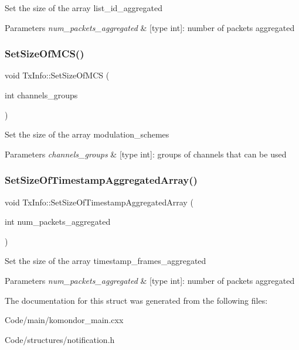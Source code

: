 Set the size of the array list\+\_\+id\+\_\+aggregated 
\begin{DoxyParams}{Parameters}
{\em num\+\_\+packets\+\_\+aggregated} & \mbox{[}type int\mbox{]}\+: number of packets aggregated \\
\hline
\end{DoxyParams}
\mbox{\label{structTxInfo_a169074644cac33d0c8c547ef99dded16}} 
\subsubsection{\texorpdfstring{Set\+Size\+Of\+M\+C\+S()}{SetSizeOfMCS()}}
{\footnotesize\ttfamily void Tx\+Info\+::\+Set\+Size\+Of\+M\+CS (\begin{DoxyParamCaption}\item[{int}]{channels\+\_\+groups }\end{DoxyParamCaption})\hspace{0.3cm}{\ttfamily [inline]}}

Set the size of the array modulation\+\_\+schemes 
\begin{DoxyParams}{Parameters}
{\em channels\+\_\+groups} & \mbox{[}type int\mbox{]}\+: groups of channels that can be used \\
\hline
\end{DoxyParams}
\mbox{\label{structTxInfo_afe5b38350ba2e0b39526eee01cf0294b}} 
\subsubsection{\texorpdfstring{Set\+Size\+Of\+Timestamp\+Aggregated\+Array()}{SetSizeOfTimestampAggregatedArray()}}
{\footnotesize\ttfamily void Tx\+Info\+::\+Set\+Size\+Of\+Timestamp\+Aggregated\+Array (\begin{DoxyParamCaption}\item[{int}]{num\+\_\+packets\+\_\+aggregated }\end{DoxyParamCaption})\hspace{0.3cm}{\ttfamily [inline]}}

Set the size of the array timestamp\+\_\+frames\+\_\+aggregated 
\begin{DoxyParams}{Parameters}
{\em num\+\_\+packets\+\_\+aggregated} & \mbox{[}type int\mbox{]}\+: number of packets aggregated \\
\hline
\end{DoxyParams}


The documentation for this struct was generated from the following files\+:\begin{DoxyCompactItemize}
\item 
Code/main/komondor\+\_\+main.\+cxx\item 
Code/structures/notification.\+h\end{DoxyCompactItemize}
